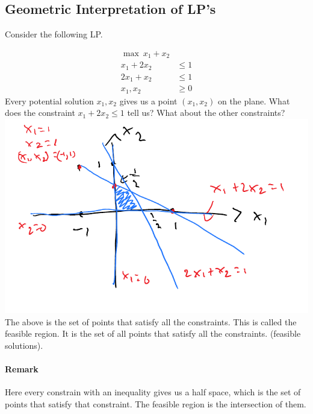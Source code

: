 \documentclass[12 pt]{article}
\begin{document}
        \subsection{Geometric Interpretation of LP's} Consider the following
        LP.

        \begin{align*}
          \max \ x_1+x_2
          \\ x_1 + 2x_2  & \leq 1
          \\ 2x_1 + x_2 & \leq 1
          \\ x_1, x_2 & \geq 0
        \end{align*}
        Every potential solution $x_1, x_2$ gives us a point $(x_1,
        x_2)$ on the plane.
        What does the constraint $x_1 + 2x_2 \leq 1$ tell us? What
        about the other constraints?
        \\ \includegraphics[width=.9\textwidth]{i100.pdf}
        The above is the set of points that satisfy all the
        constraints. This is called the feasible region. It is the set
        of all points that satisfy all the constraints. (feasible
        solutions).
        \paragraph{Remark} Here every constrain with an inequality
        gives us a half space, which is the set of points that satisfy
        that constraint. The feasible region is the intersection of them.
\end{document}
